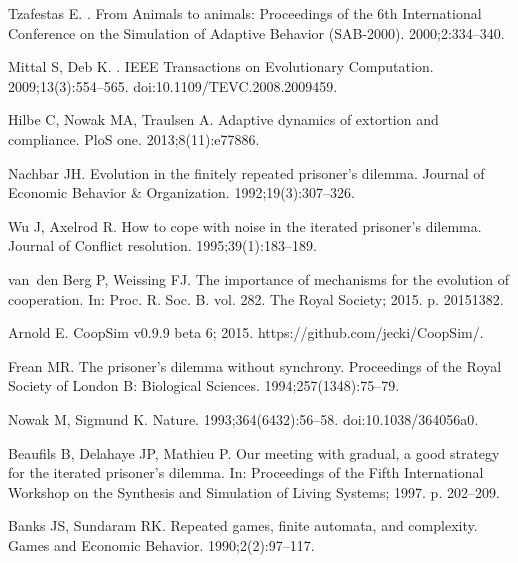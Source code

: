 \documentclass[10pt,letterpaper]{article}
\begin{document}
\begin{thebibliography}{10}
Tzafestas E.
.
\newblock From Animals to animals: Proceedings of the 6th International
  Conference on the Simulation of Adaptive Behavior {(SAB-2000)}.
  2000;2:334--340.

Mittal S, Deb K.
.
\newblock IEEE Transactions on Evolutionary Computation. 2009;13(3):554--565.
\newblock doi:{10.1109/TEVC.2008.2009459}.

Hilbe C, Nowak MA, Traulsen A.
\newblock Adaptive dynamics of extortion and compliance.
\newblock PloS one. 2013;8(11):e77886.

Nachbar JH.
\newblock Evolution in the finitely repeated prisoner's dilemma.
\newblock Journal of Economic Behavior \& Organization. 1992;19(3):307--326.

Wu J, Axelrod R.
\newblock How to cope with noise in the iterated prisoner's dilemma.
\newblock Journal of Conflict resolution. 1995;39(1):183--189.

van~den Berg P, Weissing FJ.
\newblock The importance of mechanisms for the evolution of cooperation.
\newblock In: Proc. R. Soc. B. vol. 282. The Royal Society; 2015. p. 20151382.

Arnold E. CoopSim v0.9.9 beta 6; 2015.
\newblock https://github.com/jecki/CoopSim/.

Frean MR.
\newblock The prisoner's dilemma without synchrony.
\newblock Proceedings of the Royal Society of London B: Biological Sciences.
  1994;257(1348):75--79.

Nowak M, Sigmund K.
\newblock Nature. 1993;364(6432):56--58.
\newblock doi:{10.1038/364056a0}.

Beaufils B, Delahaye JP, Mathieu P.
\newblock Our meeting with gradual, a good strategy for the iterated
  prisoner’s dilemma.
\newblock In: Proceedings of the Fifth International Workshop on the Synthesis
  and Simulation of Living Systems; 1997. p. 202--209.

Banks JS, Sundaram RK.
\newblock Repeated games, finite automata, and complexity.
\newblock Games and Economic Behavior. 1990;2(2):97--117.


\end{thebibliography}
\end{document}
